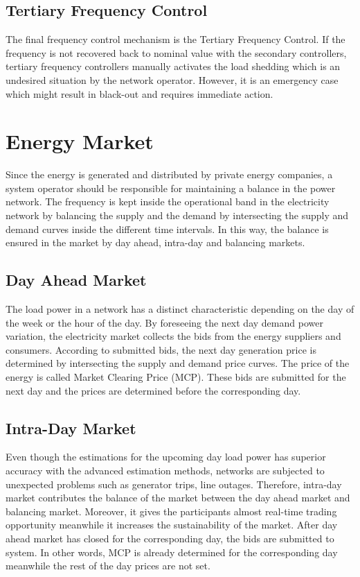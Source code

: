 \subsection{Tertiary Frequency Control}
The final frequency control mechanism is the Tertiary Frequency Control. If the frequency is not recovered back to nominal value with the secondary controllers, tertiary frequency controllers manually activates the load shedding which is an undesired situation by the network operator. However, it is an emergency case which might result in black-out and requires immediate action.
\section{Energy Market}
Since the energy is generated and distributed by private energy companies, a system operator should be responsible for maintaining a balance in the power network. The frequency is kept inside the operational band in the electricity network by balancing the supply and the demand by intersecting the supply and demand curves inside the different time intervals. In this way, the balance is ensured in the market by day ahead, intra-day and balancing markets. 
\subsection{Day Ahead Market}
The load power in a network has a distinct characteristic depending on the day of the week or the hour of the day. By foreseeing the next day demand power variation, the electricity market collects the bids from the energy suppliers and consumers. According to submitted bids, the next day generation price is determined by intersecting the supply and demand price curves. The price of the energy is called Market Clearing Price (MCP). These bids are submitted for the next day and the prices are determined before the corresponding day.
\subsection{Intra-Day Market}
Even though the estimations for the upcoming day load power has superior accuracy with the advanced estimation methods, networks are subjected to unexpected problems such as generator trips, line outages. Therefore, intra-day market contributes the balance of the market between the day ahead market and balancing market. Moreover, it gives the participants almost real-time trading opportunity meanwhile it increases the sustainability of the market. After day ahead market has closed for the corresponding day, the bids are submitted to system. In other words, MCP is already determined for the corresponding day meanwhile the rest of the day prices are not set. 
